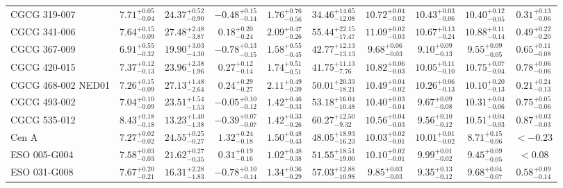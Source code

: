 \documentclass[onecolumn]{mn2e}
\begin{document}
\begin{landscape}
{\begin{center}
\begin{longtable}{lccccccccc}
CGCG 319-007 & $7.71_{-0.04}^{+0.05}$ & $24.37_{-0.90}^{+0.52}$ & $-0.48_{-0.14}^{+0.15}$ & $1.76_{-0.56}^{+0.76}$ &$34.46_{-12.08}^{+14.65}$ & $10.72_{-0.02}^{+0.04}$ & $10.43_{-0.06}^{+0.03}$ & $10.40_{-0.05}^{+0.12}$ & $0.31_{-0.06}^{+0.13}$ \\
CGCG 341-006 & $7.64_{-0.09}^{+0.15}$ & $27.48_{-3.87}^{+2.48}$ & $0.18_{-0.24}^{+0.20}$ & $2.09_{-0.26}^{+0.47}$ &$55.44_{-17.47}^{+22.15}$ & $11.09_{-0.03}^{+0.02}$ & $10.67_{-0.24}^{+0.13}$ & $10.88_{-0.14}^{+0.11}$ & $0.49_{-0.20}^{+0.22}$ \\
CGCG 367-009 & $6.91_{-0.32}^{+0.55}$ & $19.90_{-4.30}^{+3.03}$ & $-0.78_{-0.15}^{+0.13}$ & $1.58_{-0.45}^{+0.55}$ &$42.77_{-13.13}^{+12.13}$ & $9.68_{-0.03}^{+0.06}$ & $9.10_{-0.13}^{+0.09}$ & $9.55_{-0.05}^{+0.09}$ & $0.65_{-0.08}^{+0.11}$ \\
CGCG 420-015 & $7.37_{-0.13}^{+0.12}$ & $23.96_{-1.96}^{+2.38}$ & $0.27_{-0.14}^{+0.12}$ & $1.74_{-0.51}^{+0.51}$ &$41.75_{-7.76}^{+11.13}$ & $10.82_{-0.03}^{+0.06}$ & $10.05_{-0.10}^{+0.11}$ & $10.75_{-0.04}^{+0.07}$ & $0.78_{-0.06}^{+0.06}$ \\
CGCG 468-002 NED01 & $7.26_{-0.09}^{+0.15}$ & $27.13_{-2.64}^{+1.48}$ & $0.24_{-0.27}^{+0.29}$ & $2.11_{-0.39}^{+0.49}$ &$50.01_{-18.21}^{+20.33}$ & $10.49_{-0.02}^{+0.04}$ & $10.26_{-0.13}^{+0.06}$ & $10.10_{-0.13}^{+0.20}$ & $0.21_{-0.13}^{+0.24}$ \\
CGCG 493-002 & $7.04_{-0.09}^{+0.10}$ & $23.51_{-1.53}^{+1.54}$ & $-0.05_{-0.12}^{+0.10}$ & $1.42_{-0.33}^{+0.46}$ &$53.18_{-10.48}^{+16.04}$ & $10.40_{-0.04}^{+0.03}$ & $9.67_{-0.08}^{+0.09}$ & $10.31_{-0.06}^{+0.04}$ & $0.75_{-0.06}^{+0.05}$ \\
CGCG 535-012 & $8.43_{-0.18}^{+0.18}$ & $13.23_{-1.38}^{+1.40}$ & $-0.39_{-0.07}^{+0.07}$ & $1.42_{-0.26}^{+0.33}$ &$60.27_{-9.32}^{+12.50}$ & $10.56_{-0.03}^{+0.04}$ & $9.56_{-0.12}^{+0.10}$ & $10.51_{-0.03}^{+0.04}$ & $0.87_{-0.03}^{+0.03}$ \\
Cen A & $7.27_{-0.02}^{+0.02}$ & $24.55_{-0.27}^{+0.25}$ & $1.32_{-0.18}^{+0.24}$ & $1.50_{-0.43}^{+0.48}$ &$48.05_{-16.23}^{+18.93}$ & $10.03_{-0.01}^{+0.02}$ & $10.01_{-0.02}^{+0.01}$ & $8.71_{-0.06}^{+0.15}$ & $<-0.23$ \\
ESO 005-G004 & $7.58_{-0.03}^{+0.03}$ & $21.62_{-0.35}^{+0.27}$ & $0.31_{-0.16}^{+0.19}$ & $1.02_{-0.38}^{+0.48}$ &$51.55_{-19.00}^{+18.51}$ & $10.10_{-0.01}^{+0.02}$ & $9.99_{-0.02}^{+0.01}$ & $9.45_{-0.05}^{+0.09}$ & $<0.08$ \\
ESO 031-G008 & $7.67_{-0.21}^{+0.20}$ & $16.31_{-1.83}^{+2.28}$ & $-0.78_{-0.14}^{+0.10}$ & $1.34_{-0.29}^{+0.36}$ &$57.03_{-10.98}^{+12.88}$ & $9.85_{-0.03}^{+0.03}$ & $9.35_{-0.12}^{+0.13}$ & $9.68_{-0.07}^{+0.04}$ & $0.58_{-0.14}^{+0.09}$ \\

\end{longtable}
\end{center}}
\end{landscape}
\end{document}
